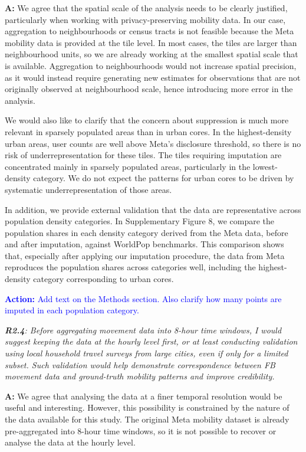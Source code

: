 \documentclass[12pt,a4paper,oneside, reqno]{amsart}
\begin{document}
\setlength{\leftskip}{1cm}\textbf{A:} We agree that the spatial scale of the analysis needs to be clearly justified, particularly when working with privacy-preserving mobility data. In our case, aggregation to neighbourhoods or census tracts is not feasible because the Meta mobility data is provided at the tile level. In most cases, the tiles are larger than neighbourhood units, so we are already working at the smallest spatial scale that is available. Aggregation to neighbourhoods would not increase spatial precision, as it would instead require generating new estimates for observations that are not originally observed at neighbourhood scale, hence introducing more error in the analysis.

We would also like to clarify that the concern about suppression is much more relevant in sparsely populated areas than in urban cores. In the highest-density urban areas, user counts are well above Meta's disclosure threshold, so there is no risk of underrepresentation for these tiles. The tiles requiring imputation are concentrated mainly in sparsely populated areas, particularly in the lowest-density category. We do not expect the patterns for urban cores to be driven by systematic underrepresentation of those areas.

In addition, we provide external validation that the data are representative across population density categories. In Supplementary Figure 8, we compare the population shares in each density category derived from the Meta data, before and after imputation, against WorldPop benchmarks. This comparison shows that, especially after applying our imputation procedure, the data from Meta reproduces the population shares across categories well, including the highest-density category corresponding to urban cores. 

\textcolor{blue}{\textbf{Action:} Add text on the Methods section. Also clarify how many points are imputed in each population category.}

\setlength{\leftskip}{0cm} \textit{\textbf{R2.4}: Before aggregating movement data into 8-hour time windows, I would suggest keeping the data at the hourly level first, or at least conducting validation using local household travel surveys from large cities, even if only for a limited subset. Such validation would help demonstrate correspondence between FB movement data and ground-truth mobility patterns and improve credibility.}

\setlength{\leftskip}{1cm}\textbf{A:} We agree that analysing the data at a finer temporal resolution would be useful and interesting. However, this possibility is constrained by the nature of the data available for this study. The original Meta mobility dataset is already pre-aggregated into 8-hour time windows, so it is not possible to recover or analyse the data at the hourly level.
\end{document}
